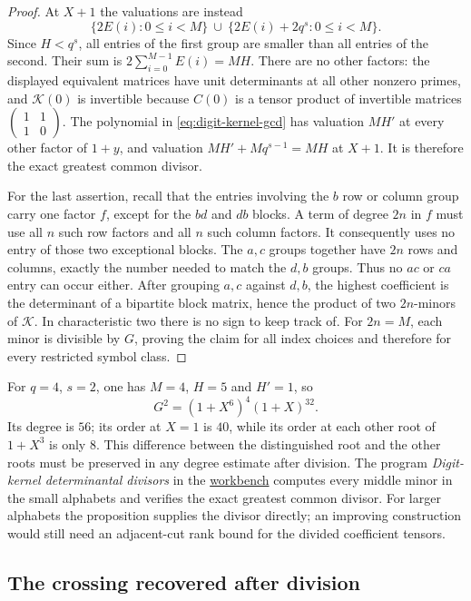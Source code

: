 \begin{proof}
At $X+1$ the valuations are instead
\[
 \{2E(i):0\leq i<M\}
 \ \cup\ \{2E(i)+2q^s:0\leq i<M\}.
\]
Since $H<q^s$, all entries of the first group are smaller than all
entries of the second. Their sum is
$2\sum_{i=0}^{M-1}E(i)=MH$.
There are no other factors: the displayed equivalent matrices have
unit determinants at all other nonzero primes, and $\mathcal K(0)$ is
invertible because $C(0)$ is a tensor product of invertible matrices
$\left(\begin{smallmatrix}1&1\\1&0\end{smallmatrix}\right)$.
The polynomial in \eqref{eq:digit-kernel-gcd} has valuation $MH'$
at every other factor of $1+y$, and valuation
$MH'+M q^{s-1}=MH$ at $X+1$. It is therefore the exact greatest
common divisor.

For the last assertion, recall that the entries involving the $b$ row
or column group carry one factor $f$, except for the $bd$ and $db$
blocks. A term of degree $2n$ in $f$ must use all $n$ such row factors
and all $n$ such column factors. It consequently uses no entry of
those two exceptional blocks. The $a,c$ groups together have $2n$
rows and columns, exactly the number needed to match the $d,b$ groups.
Thus no $ac$ or $ca$ entry can occur either. After grouping $a,c$
against $d,b$, the highest coefficient is the determinant of a
bipartite block matrix, hence the product of two $2n$-minors of
$\mathcal K$. In characteristic two there is no sign to keep track of.
For $2n=M$, each minor is divisible by $G$, proving the claim for
all index choices and therefore for every restricted symbol class.
\end{proof}

For $q=4$, $s=2$, one has $M=4$, $H=5$ and $H'=1$, so
\[
 G^2=(1+X^6)^4(1+X)^{32}.
\]
Its degree is $56$; its order at $X=1$ is $40$, while its order at
each other root of $1+X^3$ is only $8$.
This difference between the distinguished root and the other roots
must be preserved in any degree estimate after division.
The program \emph{Digit-kernel determinantal divisors} in the
\href{\workbenchurl}{workbench} computes every middle minor in the
small alphabets and verifies the exact greatest common divisor.
For larger alphabets the proposition supplies the divisor directly;
an improving construction would still need an adjacent-cut rank
bound for the divided coefficient tensors.

\subsection{The crossing recovered after division}


